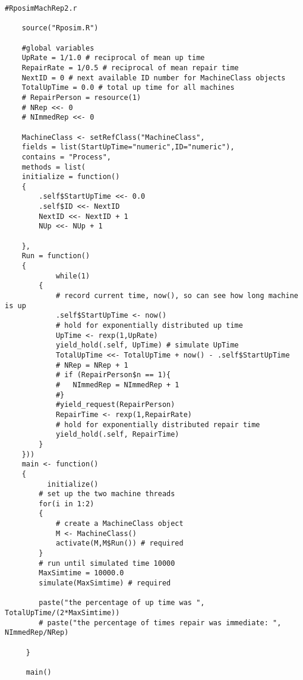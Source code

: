 \documentclass[titlepage]{article}
\begin{document}
\begin{verbatim}
#RposimMachRep2.r

	source("Rposim.R")

	#global variables
	UpRate = 1/1.0 # reciprocal of mean up time
	RepairRate = 1/0.5 # reciprocal of mean repair time
	NextID = 0 # next available ID number for MachineClass objects
	TotalUpTime = 0.0 # total up time for all machines
	# RepairPerson = resource(1)
	# NRep <<- 0
	# NImmedRep <<- 0

	MachineClass <- setRefClass("MachineClass",
	fields = list(StartUpTime="numeric",ID="numeric"),
	contains = "Process",
	methods = list(
	initialize = function()
	{
		.self$StartUpTime <<- 0.0
		.self$ID <<- NextID
		NextID <<- NextID + 1
		NUp <<- NUp + 1

	},
	Run = function()
	{
			while(1)
		{  
			# record current time, now(), so can see how long machine is up
			.self$StartUpTime <- now()
			# hold for exponentially distributed up time
			UpTime <- rexp(1,UpRate)
			yield_hold(.self, UpTime) # simulate UpTime
			TotalUpTime <<- TotalUpTime + now() - .self$StartUpTime
			# NRep = NRep + 1
			# if (RepairPerson$n == 1){
			#	NImmedRep = NImmedRep + 1
			#}
			#yield_request(RepairPerson)
			RepairTime <- rexp(1,RepairRate)
			# hold for exponentially distributed repair time
			yield_hold(.self, RepairTime)
		}
	}))
	main <- function()
	{
		  initialize()
		# set up the two machine threads
		for(i in 1:2)
		{
			# create a MachineClass object
			M <- MachineClass()
			activate(M,M$Run()) # required
		}
		# run until simulated time 10000
		MaxSimtime = 10000.0
		simulate(MaxSimtime) # required
			
		paste("the percentage of up time was ", TotalUpTime/(2*MaxSimtime))
		# paste("the percentage of times repair was immediate: ", NImmedRep/NRep)

	 }
	 
	 main()

\end{verbatim}
\end{document}
